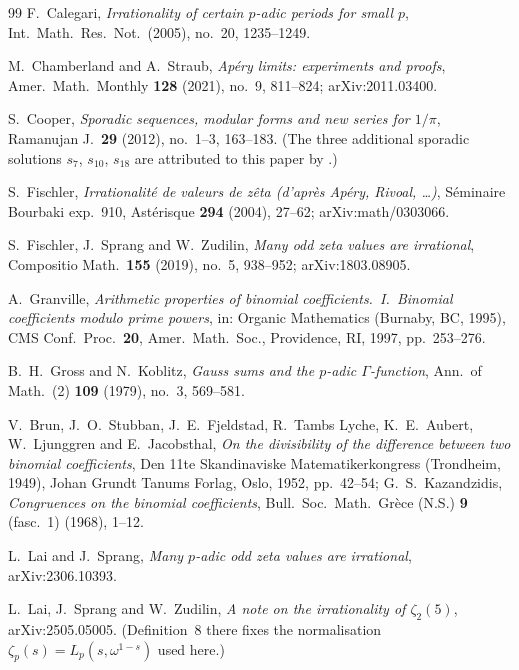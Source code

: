 \documentclass[11pt,reqno]{article}
\theoremstyle{plain}
\theoremstyle{definition}
\theoremstyle{remark}
\numberwithin{equation}{section}
\begin{document}
\begin{thebibliography}{99}
F.~Calegari,
\emph{Irrationality of certain $p$-adic periods for small $p$},
Int.\ Math.\ Res.\ Not.\ (2005), no.~20, 1235--1249.

M.~Chamberland and A.~Straub,
\emph{Ap\'ery limits: experiments and proofs},
Amer.\ Math.\ Monthly \textbf{128} (2021), no.~9, 811--824;
arXiv:2011.03400.

S.~Cooper,
\emph{Sporadic sequences, modular forms and new series for $1/\pi$},
Ramanujan J.\ \textbf{29} (2012), no.~1--3, 163--183.
(The three additional sporadic solutions $s_7$, $s_{10}$, $s_{18}$ are
attributed to this paper by \cite[\S2]{MalikStraub}.)

S.~Fischler,
\emph{Irrationalit\'e de valeurs de z\^eta (d'apr\`es Ap\'ery, Rivoal, \dots)},
S\'eminaire Bourbaki exp.\ 910, Ast\'erisque \textbf{294} (2004), 27--62;
arXiv:math/0303066.

S.~Fischler, J.~Sprang and W.~Zudilin,
\emph{Many odd zeta values are irrational},
Compositio Math.\ \textbf{155} (2019), no.~5, 938--952; arXiv:1803.08905.

A.~Granville,
\emph{Arithmetic properties of binomial coefficients.\ I.\ Binomial coefficients
modulo prime powers},
in: Organic Mathematics (Burnaby, BC, 1995), CMS Conf.\ Proc.\ \textbf{20},
Amer.\ Math.\ Soc., Providence, RI, 1997, pp.~253--276.

B.~H.~Gross and N.~Koblitz,
\emph{Gauss sums and the $p$-adic $\Gamma$-function},
Ann.\ of Math.\ (2) \textbf{109} (1979), no.~3, 569--581.

V.~Brun, J.~O.~Stubban, J.~E.~Fjeldstad, R.~Tambs Lyche, K.~E.~Aubert,
W.~Ljunggren and E.~Jacobsthal,
\emph{On the divisibility of the difference between two binomial coefficients},
Den 11te Skandinaviske Matematikerkongress (Trondheim, 1949),
Johan Grundt Tanums Forlag, Oslo, 1952, pp.~42--54;
G.~S.~Kazandzidis,
\emph{Congruences on the binomial coefficients},
Bull.\ Soc.\ Math.\ Gr\`ece (N.S.) \textbf{9} (fasc.~1) (1968), 1--12.

L.~Lai and J.~Sprang,
\emph{Many $p$-adic odd zeta values are irrational},
arXiv:2306.10393.

L.~Lai, J.~Sprang and W.~Zudilin,
\emph{A note on the irrationality of $\zeta_2(5)$},
arXiv:2505.05005.
(Definition~8 there fixes the normalisation $\zeta_p(s)=L_p(s,\omega^{1-s})$
used here.)


\end{thebibliography}
\end{document}
